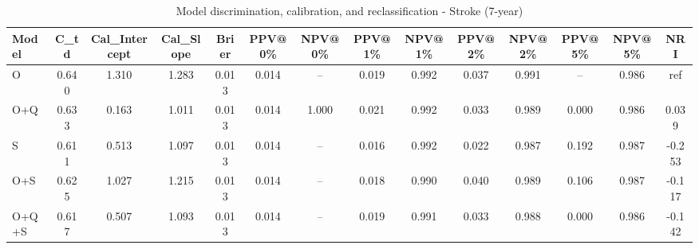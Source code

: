\begin{table}[htbp]
\centering
\small
\caption{Model discrimination, calibration, and reclassification - Stroke (7-year)}
\label{tab:perf_stroke_7y}
\begin{tabular}{lccccccccccccc}
\toprule
Model & C\_td & Cal\_Intercept & Cal\_Slope & Brier & PPV@0\% & NPV@0\% & PPV@1\% & NPV@1\% & PPV@2\% & NPV@2\% & PPV@5\% & NPV@5\% & NRI \\
\midrule
O & 0.640 & 1.310 & 1.283 & 0.013 & 0.014 & -- & 0.019 & 0.992 & 0.037 & 0.991 & -- & 0.986 & ref \\
O+Q & 0.633 & 0.163 & 1.011 & 0.013 & 0.014 & 1.000 & 0.021 & 0.992 & 0.033 & 0.989 & 0.000 & 0.986 & 0.039 \\
S & 0.611 & 0.513 & 1.097 & 0.013 & 0.014 & -- & 0.016 & 0.992 & 0.022 & 0.987 & 0.192 & 0.987 & -0.253 \\
O+S & 0.625 & 1.027 & 1.215 & 0.013 & 0.014 & -- & 0.018 & 0.990 & 0.040 & 0.989 & 0.106 & 0.987 & -0.117 \\
O+Q+S & 0.617 & 0.507 & 1.093 & 0.013 & 0.014 & -- & 0.019 & 0.991 & 0.033 & 0.988 & 0.000 & 0.986 & -0.142 \\
\bottomrule
\end{tabular}
\end{table}